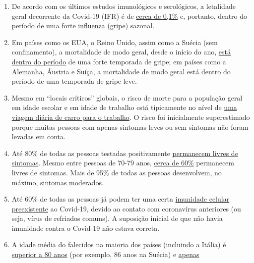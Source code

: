 \begin{enumerate}
\def\labelenumi{\arabic{enumi}.}
\tightlist
\item
  De acordo com os últimos estudos imunológicos e serológicos, a
  letalidade geral decorrente da Covid-19 (IFR) é de
  \href{https://swprs.org/studies-on-covid-19-lethality/}{cerca de
  0,1\%} e, portanto, dentro do período de uma forte
  \href{https://www.ebm-netzwerk.de/en/publications/covid-19}{influenza}
  (gripe) sazonal.
\item
  Em países como os EUA, o Reino Unido, assim como a Suécia (sem
  confinamento), a mortalidade de modo geral, desde o início do ano,
  \href{https://swprs.org/studies-on-covid-19-lethality/\#overall-mortality}{está
  dentro do período} de uma forte temporada de gripe; em países como a
  Alemanha, Áustria e Suíça, a mortalidade de modo geral está dentro do
  período de uma temporada de gripe leve.
\item
  Mesmo em ``locais críticos'' globais, o risco de morte para a
  população geral em idade escolar e em idade de trabalho está
  tipicamente no nível de
  \href{https://www.medrxiv.org/content/10.1101/2020.04.05.20054361v1}{uma
  viagem diária de carro para o trabalho}. O risco foi inicialmente
  superestimado porque muitas pessoas com apenas sintomas leves ou sem
  sintomas não foram levadas em conta.
\item
  Até 80\% de todas as pessoas testadas positivamente
  \href{https://www.bmj.com/content/369/bmj.m1375}{permanecem livres de
  sintomas}. Mesmo entre pessoas de 70-79 anos,
  \href{https://www.niid.go.jp/niid/en/2019-ncov-e/9407-covid-dp-fe-01.html}{cerca
  de 60\%} permanecem livres de sintomas. Mais de 95\% de todas as
  pessoas desenvolvem, no máximo,
  \href{https://swprs.org/studies-on-covid-19-lethality/\#hospitalizations}{sintomas
  moderados}.
\item
  Até 60\% de todas as pessoas já podem ter uma certa
  \href{https://www.cell.com/cell/fulltext/S0092-8674(20)30610-3}{imunidade
  celular preexistente} ao Covid-19, devido ao contato com coronavírus
  anteriores (ou seja, vírus de refriados comuns). A suposição inicial
  de que não havia imunidade contra o Covid-19 não estava correta.
\item
  A idade média do falecidos na maioria dos países (incluindo a Itália)
  é
  \href{https://swprs.org/studies-on-covid-19-lethality/\#age}{superior
  a 80 anos} (por exemplo, 86 anos na Suécia) e
  \href{https://www.bloomberg.com/news/articles/2020-05-26/italy-says-96-of-virus-fatalities-suffered-from-other-illnesses}{apenas
}
\end{enumerate}
